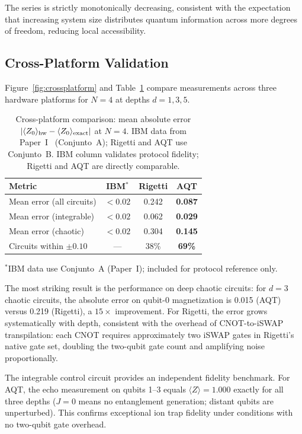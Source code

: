 \documentclass[twocolumn,showpacs,preprintnumbers,amsmath,amssymb,aps,prl]{revtex4-2}
\begin{document}
The series is strictly monotonically decreasing, consistent with the expectation
that increasing system size distributes quantum information across more degrees of
freedom, reducing local accessibility.

\subsection{Cross-Platform Validation}

Figure~\ref{fig:crossplatform} and Table~\ref{tab:crossplatform} compare
measurements across three hardware platforms for $N=4$ at depths $d = 1, 3, 5$.

\begin{table}[h]
\caption{Cross-platform comparison: mean absolute error
$|\langle Z_0\rangle_{\rm hw} - \langle Z_0\rangle_{\rm exact}|$ at $N=4$.
IBM data from Paper~I~\cite{PerezEugenio2026a} (Conjunto~A); Rigetti and AQT use
Conjunto~B. IBM column validates protocol fidelity; Rigetti and AQT are directly
comparable.}
\label{tab:crossplatform}
\begin{ruledtabular}
\begin{tabular}{lccc}
Metric & IBM$^*$ & Rigetti & AQT \\
\hline
Mean error (all circuits)   & $<0.02$ & 0.242 & \textbf{0.087} \\
Mean error (integrable)     & $<0.02$ & 0.062 & \textbf{0.029} \\
Mean error (chaotic)        & $<0.02$ & 0.304 & \textbf{0.145} \\
Circuits within $\pm0.10$   & ---     & 38\%  & \textbf{69\%}  \\
\end{tabular}
\end{ruledtabular}
$^*$IBM data use Conjunto~A (Paper~I); included for protocol reference only.
\end{table}

The most striking result is the performance on deep chaotic circuits: for $d=3$
chaotic circuits, the absolute error on qubit-0 magnetization is 0.015 (AQT)
versus 0.219 (Rigetti), a $15\times$ improvement. For Rigetti, the error grows
systematically with depth, consistent with the overhead of CNOT-to-iSWAP
transpilation: each CNOT requires approximately two iSWAP gates in Rigetti's
native gate set, doubling the two-qubit gate count and amplifying noise
proportionally.

The integrable control circuit provides an independent fidelity benchmark. For
AQT, the echo measurement on qubits 1--3 equals $\langle Z \rangle = 1.000$
exactly for all three depths ($J = 0$ means no entanglement generation; distant
qubits are unperturbed). This confirms exceptional ion trap fidelity under
conditions with no two-qubit gate overhead.
\end{document}
